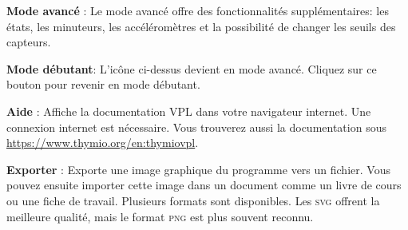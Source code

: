 \textbf{Mode avancé} : Le mode avancé offre des fonctionnalités supplémentaires:
les états, les minuteurs, les accéléromètres et la possibilité de changer les seuils des capteurs.

\textbf{Mode débutant}: L'icône ci-dessus devient  en mode avancé.
Cliquez sur ce bouton pour revenir en mode débutant.

\newpage

\textbf{Aide} : Affiche la documentation VPL dans votre navigateur internet.
Une connexion internet est nécessaire. Vous trouverez aussi la documentation sous
\href{https://www.thymio.org/en:thymiovpl}{https://www.thymio.org/en:thymiovpl}.

\bigskip

\textbf{Exporter} : \label{p.export} Exporte une image graphique du programme vers
un fichier. Vous pouvez ensuite importer cette image dans un document comme un livre de cours
ou une fiche de travail.
Plusieurs formats sont disponibles. Les \textsc{svg} offrent la meilleure qualité, mais le format
\textsc{png} est plus souvent reconnu.
